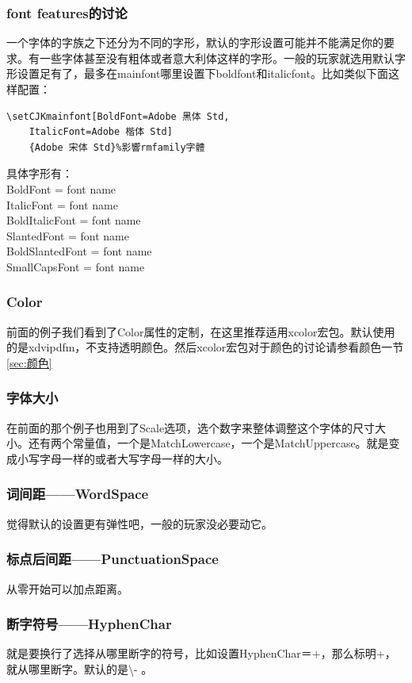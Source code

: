 \documentclass[12pt,oneside]{book}
\begin{document}
\begin{common-format}
\subsubsection{font features的讨论}
一个字体的字族之下还分为不同的字形，默认的字形设置可能并不能满足你的要求。有一些字体甚至没有粗体或者意大利体这样的字形。一般的玩家就选用默认字形设置足有了，最多在mainfont哪里设置下boldfont和italicfont。比如类似下面这样配置：
\begin{Verbatim}
\setCJKmainfont[BoldFont=Adobe 黑体 Std,
    ItalicFont=Adobe 楷体 Std]
    {Adobe 宋体 Std}%影響rmfamily字體
\end{Verbatim}

具体字形有：\\
BoldFont = font name\\
ItalicFont = font name\\
BoldItalicFont = font name\\
SlantedFont = font name\\
BoldSlantedFont = font name\\
SmallCapsFont = font name



\subsubsection{Color}
前面的例子我们看到了Color属性的定制，在这里推荐适用xcolor宏包。\XeLaTeX 默认使用的是xdvipdfm，不支持透明颜色。然后xcolor宏包对于颜色的讨论请参看颜色一节\ref{sec:颜色}

\subsubsection{字体大小}
在前面的那个例子也用到了Scale选项，选个数字来整体调整这个字体的尺寸大小。还有两个常量值，一个是MatchLowercase，一个是MatchUppercase。就是变成小写字母一样的或者大写字母一样的大小。

\subsubsection{词间距——WordSpace}
觉得默认的设置更有弹性吧，一般的玩家没必要动它。

\subsubsection{标点后间距——PunctuationSpace}
从零开始可以加点距离。

\subsubsection{断字符号——HyphenChar}
就是要换行了选择从哪里断字的符号，比如设置HyphenChar＝{+}，那么标明+，就从哪里断字。默认的是\textbackslash{}- 。


\end{common-format}
\end{document}
